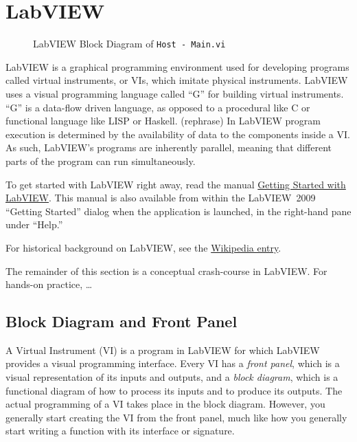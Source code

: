 
\section{LabVIEW}
\label{sec:eq_labview}

\begin{figure}[htbp]
  \centering
  \caption{LabVIEW Block Diagram of \texttt{Host - Main.vi}}
  \label{fig:eq_labview:hostmainvi}
\end{figure}

LabVIEW is a graphical programming environment used for developing programs called virtual instruments, or \glspl{VI}, which imitate physical instruments.  LabVIEW uses a visual programming language called ``G'' for building virtual instruments.  ``G'' is a data-flow driven language, as opposed to a procedural like C or functional language like LISP or Haskell.  \FIXME (rephrase) In LabVIEW program execution is determined by the availability of data to the components inside a VI.  As such, LabVIEW's programs are inherently parallel, meaning that different parts of the program can run simultaneously.

To get started with LabVIEW right away, read the manual \href{Manuals/LV_Getting_Started}{Getting Started with LabVIEW}.  This manual is also available from within the LabVIEW~2009 ``Getting Started'' dialog when the application is launched, in the right-hand pane under ``Help.''

For historical background on LabVIEW, see the \href{http://en.wikipedia.org/wiki/LabVIEW}{Wikipedia entry}.

The remainder of this section is a conceptual crash-course in LabVIEW.  For hands-on practice, \ldots \FIXME

\subsection{Block Diagram and Front Panel}
\label{sec:eq_labview:block_diagram}

A Virtual Instrument (VI) is a program in LabVIEW for which LabVIEW provides a visual programming interface.  Every VI has a \textit{front panel}, which is a visual representation of its inputs and outputs, and a \textit{block diagram}, which is a functional diagram of how to process its inputs and to produce its outputs.  The actual programming of a VI takes place in the block diagram.  However, you generally start creating the VI from the front panel, much like how you generally start writing a function with its interface or signature.

